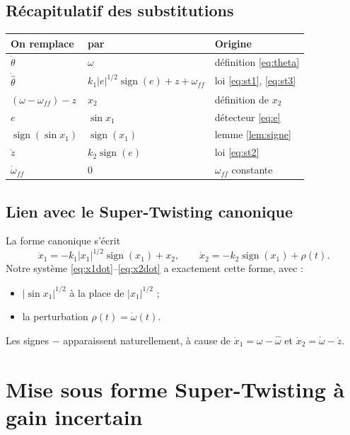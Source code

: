 \documentclass[11pt,a4paper]{article}
\numberwithin{equation}{section}
\theoremstyle{plain}
\theoremstyle{definition}
\theoremstyle{remark}
\newcommand{\sign}{\operatorname{sign}}
\newcommand{\hth}{\hat{\theta}}
\newcommand{\hw}{\hat{\omega}}
\newcommand{\wff}{\omega_{ff}}
\begin{document}
\subsection{Récapitulatif des substitutions}
\begin{center}
\renewcommand{\arraystretch}{1.3}
\begin{tabular}{|l|l|l|}
\hline
On remplace & par & Origine\\
\hline
$\dot\theta$ & $\omega$ & définition \eqref{eq:theta}\\
$\dot{\hth}$ & $k_1|e|^{1/2}\sign(e)+z+\wff$ & loi \eqref{eq:st1}, \eqref{eq:st3}\\
$(\omega-\wff)-z$ & $x_2$ & définition de $x_2$\\
$e$ & $\sin x_1$ & détecteur \eqref{eq:e}\\
$\sign(\sin x_1)$ & $\sign(x_1)$ & lemme \ref{lem:signe}\\
$\dot z$ & $k_2\sign(e)$ & loi \eqref{eq:st2}\\
$\dot\omega_{ff}$ & $0$ & $\wff$ constante\\
\hline
\end{tabular}
\end{center}

\subsection{Lien avec le Super-Twisting canonique}
La forme canonique s'écrit
\begin{equation}
\dot x_1 = -k_1|x_1|^{1/2}\sign(x_1)+x_2,\qquad \dot x_2 = -k_2\sign(x_1)+\rho(t).
\end{equation}
Notre système \eqref{eq:x1dot}--\eqref{eq:x2dot} a exactement cette forme, avec :
\begin{itemize}
  \item $|\sin x_1|^{1/2}$ à la place de $|x_1|^{1/2}$ ;
  \item la perturbation $\rho(t)=\dot\omega(t)$.
\end{itemize}
Les signes \og $-$\fg{} apparaissent naturellement, à cause de $\dot x_1=\omega-\hw$ et $\dot x_2=\dot\omega-\dot z$.

\section{Mise sous forme Super-Twisting à gain incertain}
\end{document}

